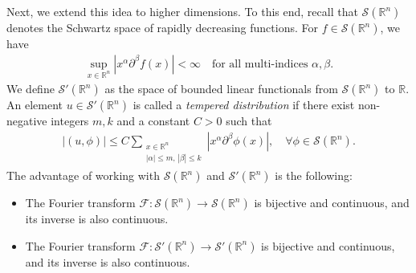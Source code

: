 \documentclass[11pt]{article}
\begin{document}
Next, we extend this idea to higher dimensions. To this end, recall that 
$\mathcal{S}(\mathbb{R}^n)$ denotes the Schwartz space of rapidly decreasing functions. 
For $f \in \mathcal{S}(\mathbb{R}^n)$, we have
\begin{align}
   \sup_{x \in \mathbb{R}^n} |x^{\alpha} \partial^{\beta} f(x)| < \infty 
   \quad \text{for all multi-indices } \alpha, \beta.
\end{align}
We define $\mathcal{S}'(\mathbb{R}^n)$ as the space of bounded linear functionals 
from $\mathcal{S}(\mathbb{R}^n)$ to $\mathbb{R}$. 
An element $u \in \mathcal{S}'(\mathbb{R}^n)$ is called a 
\emph{tempered distribution} if there exist non-negative integers $m,k$ 
and a constant $C > 0$ such that 
\begin{align}
|(u, \phi)| \le C \sum_{\substack{x \in \mathbb{R}^n \\ |\alpha|\le m,\, |\beta|\le k}} 
|x^{\alpha} \partial^{\beta} \phi(x)|, 
\quad \forall \phi \in \mathcal{S}(\mathbb{R}^n).
\end{align}
The advantage of working with $\mathcal{S}(\mathbb{R}^n)$ and 
$\mathcal{S}'(\mathbb{R}^n)$ is the following:
\begin{itemize}
    \item[1.] The Fourier transform $\mathcal{F}: \mathcal{S}(\mathbb{R}^n) \to \mathcal{S}(\mathbb{R}^n)$ 
    is bijective and continuous, and its inverse is also continuous.
    \item[2.] The Fourier transform $\mathcal{F}: \mathcal{S}'(\mathbb{R}^n) \to \mathcal{S}'(\mathbb{R}^n)$ 
    is bijective and continuous, and its inverse is also continuous.
\end{itemize}
\end{document}
